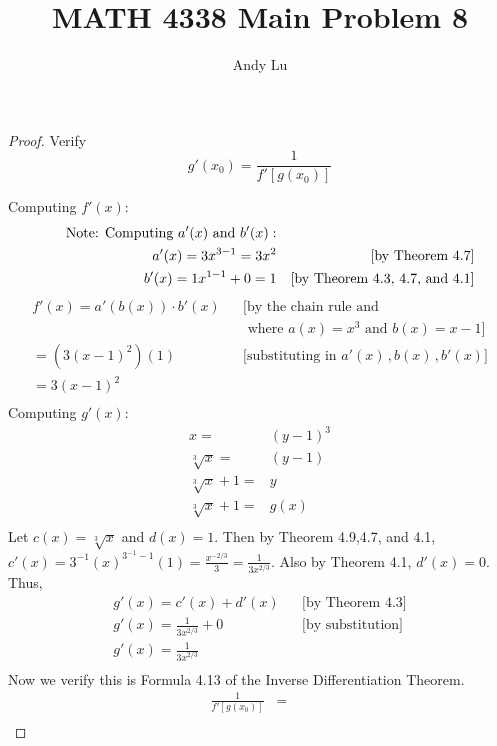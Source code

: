 \documentclass{article}
\title{MATH 4338 Main Problem 8}
\date{}
\author{Andy Lu}
\begin{document}
  \maketitle
  \begin{proof}
    Verify
    $$g'(x_0) = \frac{1}{f'[g(x_0)]}$$
    
    Computing $f'(x)$:
    \begin{align*}
       \indent \text{Note: Computing }a'(x) \text{ and } b'(x): & & \\
      a'(x) = 3x^{3-1} = 3x^2 & & \text{[by Theorem 4.7]} \\
      b'(x) = 1x^{1-1} + 0 = 1 & & \text{[by Theorem 4.3, 4.7, and 4.1]} \\
    \end{align*}
    \begin{align*}
      f'(x) = a'(b(x)) \cdot b'(x) & & \text{[by the chain rule and}\\
      & & \text{ where } a(x) = x^3 \text{ and } b(x) = x-1 ]\\
       = (3(x-1)^2)(1) & & \text{[substituting in } a'(x) \,, b(x)\,, b'(x)] \\
       = 3(x-1)^2 & & \\
    \end{align*}
    Computing $g'(x)$:
    \begin{align*}
      x =& (y-1)^3 \\
      \sqrt[3]{x}=&(y-1) \\
      \sqrt[3]{x} + 1 =& y \\
      \sqrt[3]{x} + 1 =& g(x) \\
    \end{align*}
    Let $c(x) = \sqrt[3]{x}$ and $d(x) = 1$. Then by Theorem 4.9,4.7, and 4.1, 
    $c'(x) = 3^{-1}(x)^{3^{-1} - 1}(1) = \frac{x^{-2/3}}{3} = 
    \frac{1}{3x^{2/3}}$. Also by Theorem 4.1, $d'(x) = 0$. Thus,
    \begin{align*}
      g'(x) = c'(x) + d'(x) && \text{[by Theorem 4.3]} \\
      g'(x) = \frac{1}{3x^{2/3}} + 0 && \text{[by substitution]} \\
      g'(x) = \frac{1}{3x^{2/3}} && \\
    \end{align*}
    Now we verify this is Formula 4.13 of the Inverse Differentiation Theorem.
    \begin{align*}
      \frac{1}{f'[g(x_0)]} &= &&\\

\end{align*}
\end{proof}
\end{document}
